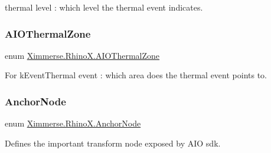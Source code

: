 thermal level \+: which level the thermal event indicates. 

\mbox{\label{namespace_ximmerse_1_1_rhino_x_a16299986ba040f9589ccf565ce232d75}} 
\subsubsection{\texorpdfstring{A\+I\+O\+Thermal\+Zone}{AIOThermalZone}}
{\footnotesize\ttfamily enum \mbox{\hyperlink{namespace_ximmerse_1_1_rhino_x_a16299986ba040f9589ccf565ce232d75}{Ximmerse.\+Rhino\+X.\+A\+I\+O\+Thermal\+Zone}}\hspace{0.3cm}{\ttfamily [strong]}}



For k\+Event\+Thermal event \+: which area does the thermal event points to. 

\mbox{\label{namespace_ximmerse_1_1_rhino_x_a09d608afdcafd91f4b0fb1260897d732}} 
\subsubsection{\texorpdfstring{Anchor\+Node}{AnchorNode}}
{\footnotesize\ttfamily enum \mbox{\hyperlink{namespace_ximmerse_1_1_rhino_x_a09d608afdcafd91f4b0fb1260897d732}{Ximmerse.\+Rhino\+X.\+Anchor\+Node}}\hspace{0.3cm}{\ttfamily [strong]}}



Defines the important transform node exposed by A\+IO sdk. 

